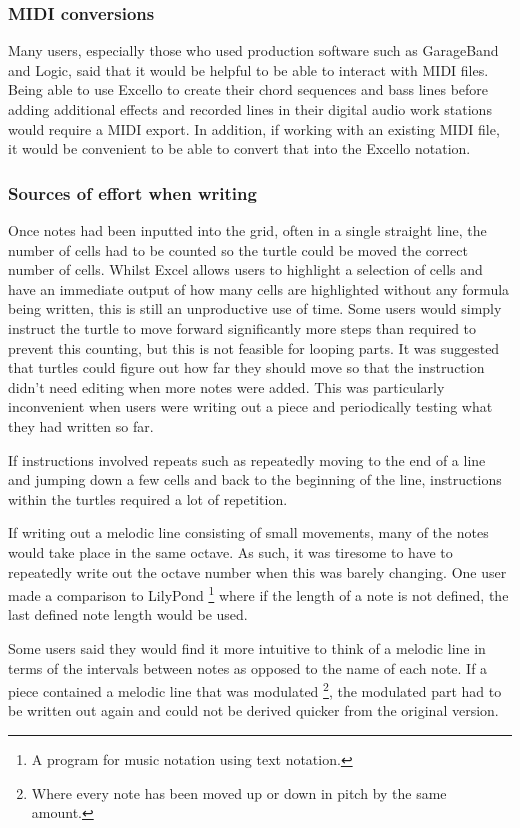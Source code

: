 \subsubsection{MIDI conversions}

Many users, especially those who used production software such as GarageBand and Logic, said that it would be helpful to be able to interact with MIDI files. Being able to use Excello to create their chord sequences and bass lines before adding additional effects and recorded lines in their digital audio work stations would require a MIDI export. In addition, if working with an existing MIDI file, it would be convenient to be able to convert that into the Excello notation.

\subsubsection{Sources of effort when writing}

Once notes had been inputted into the grid, often in a single straight line, the number of cells had to be counted so the turtle could be moved the correct number of cells. Whilst Excel allows users to highlight a selection of cells and have an immediate output of how many cells are highlighted without any formula being written, this is still an unproductive use of time. Some users would simply instruct the turtle to move forward significantly more steps than required to prevent this counting, but this is not feasible for looping parts. It was suggested that turtles could figure out how far they should move so that the instruction didn't need editing when more notes were added. This was particularly inconvenient when users were writing out a piece and periodically testing what they had written so far.

If instructions involved repeats such as repeatedly moving to the end of a line and jumping down a few cells and back to the beginning of the line, instructions within the turtles required a lot of repetition.

If writing out a melodic line consisting of small movements, many of the notes would take place in the same octave. As such, it was tiresome to have to repeatedly write out the octave number when this was barely changing. One user made a comparison to LilyPond \footnote{A program for music notation using text notation.} \cite{sandberg:lily} where if the length of a note is not defined, the last defined note length would be used.

Some users said they would find it more intuitive to think of a melodic line in terms of the intervals between notes as opposed to the name of each note. If a piece contained a melodic line that was modulated \footnote{Where every note has been moved up or down in pitch by the same amount.}, the modulated part had to be written out again and could not be derived quicker from the original version.

